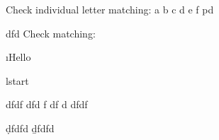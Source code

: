 Check individual letter matching: a b c d e f pd

    dfd
Check \q{} matching: 







\i Hello

\lstart

\lend
lstart


dfdf
dfd
f
df
d
dfdf



\d{dfdfd}
\b{dfdfd}
